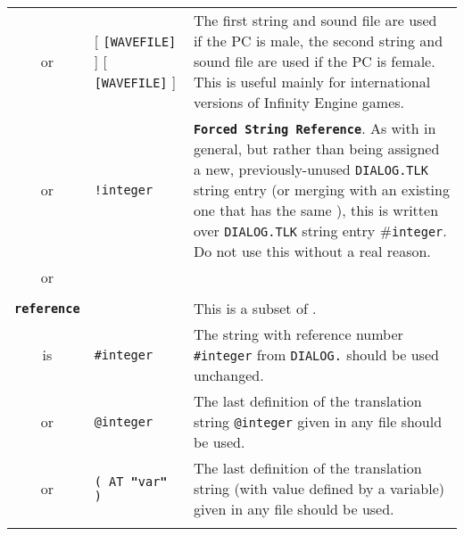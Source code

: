 \documentclass{article}
\def\ttref#1{\ahrefloc{#1}{\tt #1}}
\def\DEFINE#1{{\tt \bf #1}\label{#1}\index{#1}}
\def\t#1{{\tt #1}}
\def\Ob{{\color{red} [ }}
\def\Oe{{\color{red} ] }}
\begin{document}
\begin{tabular}{cp{10in}|p{10in}}
or & \ttref{String} \Ob \t{[WAVEFILE]} \Oe \ttref{String} \Ob \t{[WAVEFILE]} \Oe &
The first string and sound file are used if the PC is male, the second
string and sound file are used if the PC is female. This is useful mainly
for international versions of Infinity Engine games. \\

or & \t{!integer} \ttref{text} & \DEFINE{Forced String Reference}. As with
\ttref{text} in general, but rather than being assigned a new,
previously-unused \t{DIALOG.TLK} string entry (or merging with an existing
one that has the same \ttref{text}), this \ttref{text} is written over
\t{DIALOG.TLK} string entry \#\t{integer}. Do not use this without a real reason.
\\
or & \ttref{reference} & \\

\\

\DEFINE{reference} & & This is a subset of \ttref{text}. \\
is & \t{\#integer} & The string with reference number \t{\#integer} from
\t{DIALOG.}\ttref{TLK} should be used unchanged. \\

or & \t{@integer} & The last definition of the translation string
\t{@integer} given in any \ttref{TRA} file should be used.\\

or & \t{( AT {\bf{"}}var{\bf{"}} )} & The last definition of the translation string
(with value defined by a variable) given in any \ttref{TRA} file should be used.\\

\\


\end{tabular}
\end{document}
